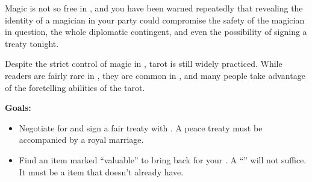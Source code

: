 \documentclass[blue]{NeptuneBall}
\begin{document}
\begin{itemize}
  Magic is not so free in \pAtlantis{}, and you have been warned repeatedly that revealing the identity of a magician in your party could compromise the safety of the magician in question, the whole diplomatic contingent, and even the possibility of signing a treaty tonight.
  
  Despite the strict control of magic in \pAtlantis{}, tarot is still widely practiced. While readers are fairly rare in \pPacifica{}, they are common in \pAtlantis{}, and many people take advantage of the foretelling abilities of the tarot.
\end{itemize}

{\bf Goals:} 
\begin{itemize}
	\item Negotiate for and sign a fair treaty with \pAtlantis{}. A peace treaty must be accompanied by a royal marriage.
	\item Find an item marked ``valuable'' to bring back for your \cPacificanRuler{\King}. A ``\iSignetRing{}'' will not suffice. It must be a item that \cPacificanRuler{\King} \cPacificanRuler{} doesn't already have.
\end{itemize}
\end{document}

